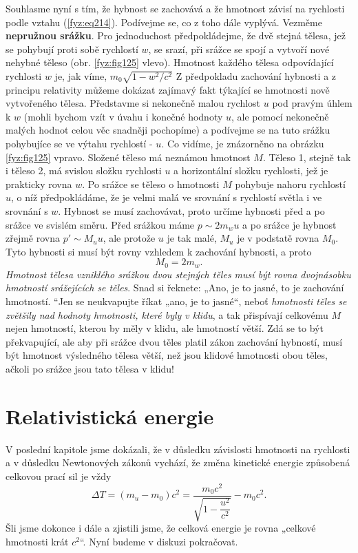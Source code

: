     Souhlasme nyní s tím, že hybnost se zachovává a že hmotnost závisí na rychlosti podle vztahu 
    (\ref{fyz:eq214}). Podívejme se, co z toho dále vyplývá. Vezměme \textbf{nepružnou srážku}. Pro 
    jednoduchost předpokládejme, že dvě stejná tělesa, jež se pohybují proti sobě rychlostí \(w\), 
    se srazí, při srážce se spojí a vytvoří nové nehybné těleso (obr. \ref{fyz:fig125} vlevo). 
    Hmotnost každého tělesa odpovídající rychlosti \(w\) je, jak víme, \(m_0\sqrt{1 - w^2/c^2}\) Z 
    předpokladu zachování hybnosti a z principu relativity můžeme dokázat zajímavý fakt týkající se 
    hmotnosti nově vytvořeného tělesa. Představme si nekonečně malou rychlost \(u\) pod pravým 
    úhlem k \(w\) (mohli bychom vzít v úvahu i konečné hodnoty \(u\), ale pomocí nekonečně malých 
    hodnot celou věc snadněji pochopíme) a podívejme se na tuto srážku pohybujíce se ve výtahu 
    rychlostí - \(u\). Co vidíme, je znázorněno na obrázku \ref{fyz:fig125} vpravo. Složené těleso 
    má neznámou hmotnost \(M\). Těleso 1, stejně tak i těleso 2, má svislou složku rychlosti \(u\) 
    a horizontální složku rychlosti, jež je prakticky rovna \(w\). Po srážce se těleso o 
    hmotnosti \(M\) pohybuje nahoru rychlostí \(u\), o níž předpokládáme, že je velmi malá ve 
    srovnání s rychlostí světla i ve srovnání s \(w\). Hybnost se musí zachovávat, proto určíme 
    hybnosti před a po srážce ve svislém směru. Před srážkou máme \(p \sim 2m_wu\) a po srážce je 
    hybnost zřejmě rovna \(p' \sim M_uu\), ale protože \(u\) je tak malé, \(M_u\) je v podstatě 
    rovna \(M_0\). Tyto hybnosti si musí být rovny vzhledem k zachování hybnosti, a proto
    \begin{equation}\label{fyz:eq216}
      M_0 = 2m_w.
    \end{equation}
    \emph{Hmotnost tělesa vzniklého srážkou dvou stejných těles musí být rovna dvojnásobku 
    hmotností srážejících se těles}. Snad si řeknete: „Ano, je to jasné, to je zachování hmotností. 
    “Jen se neukvapujte říkat „ano, je to jasné“, neboť \emph{hmotnosti těles se zvětšily nad 
    hodnoty hmotnosti, které byly v klidu}, a tak přispívají celkovému \(M\) nejen hmotností, 
    kterou by měly v klidu, ale hmotností větší. Zdá se to být překvapující, ale aby při srážce 
    dvou těles platil zákon zachování hybností, musí být hmotnost výsledného tělesa větší, než jsou 
    klidové hmotnosti obou těles, ačkoli po srážce jsou tato tělesa v klidu!
    
  \section{Relativistická energie}\label{fyz:IchapXVIsecV}
    V poslední kapitole jsme dokázali, že v důsledku závislosti hmotnosti na rychlosti a v důsledku 
    Newtonových zákonů vychází, že změna kinetické energie způsobená celkovou prací sil je vždy
    \begin{equation}\label{fyz:eq217}
      \Delta T = (m_u - m_0)c^2 = \frac{m_0c^2}{\sqrt{1 - \dfrac{u^2}{c^2}}} - m_0c^2.
    \end{equation}
    Šli jsme dokonce i dále a zjistili jsme, že celková energie je rovna „celkové hmotnosti krát 
    \(c^2\)“. Nyní budeme v diskuzi pokračovat.
    
